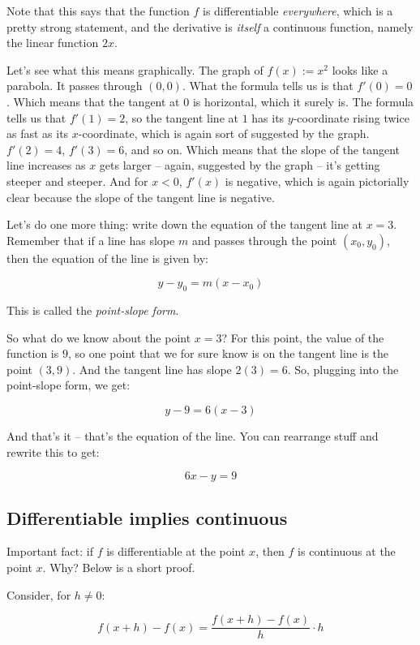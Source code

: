 \documentclass[10pt]{amsart}
\begin{document}
Note that this says that the function $f$ is differentiable {\em
everywhere}, which is a pretty strong statement, and the derivative
is {\em itself} a continuous function, namely the linear function $2x$.

Let's see what this means graphically. The graph of $f(x) := x^2$
looks like a parabola. It passes through $(0,0)$. What the formula
tells us is that $f'(0) = 0$. Which means that the tangent at $0$ is
horizontal, which it surely is. The formula tells us that $f'(1) = 2$,
so the tangent line at $1$ has its $y$-coordinate rising twice as fast
as its $x$-coordinate, which is again sort of suggested by the
graph. $f'(2) = 4$, $f'(3) = 6$, and so on. Which means that the slope
of the tangent line increases as $x$ gets larger -- again, suggested
by the graph -- it's getting steeper and steeper. And for $x < 0$,
$f'(x)$ is negative, which is again pictorially clear because the
slope of the tangent line is negative.

Let's do one more thing: write down the equation of the tangent line
at $x = 3$. Remember that if a line has slope $m$ and passes through
the point $(x_0,y_0)$, then the equation of the line is given by:

$$y - y_0 = m(x - x_0)$$

This is called the {\em point-slope form}.

So what do we know about the point $x = 3$? For this point, the value
of the function is $9$, so one point that we for sure know is on the
tangent line is the point $(3,9)$. And the tangent line has slope
$2(3) = 6$. So, plugging into the point-slope form, we get:

$$y - 9 = 6(x - 3)$$

And that's it -- that's the equation of the line. You can rearrange
stuff and rewrite this to get:

$$6x - y = 9$$

\subsection{Differentiable implies continuous}

Important fact: if $f$ is differentiable at the point $x$, then $f$ is
continuous at the point $x$. Why? Below is a short proof.

Consider, for $h \ne 0$:

\begin{equation*}
  f(x + h) - f(x) = \frac{f(x + h) - f(x)}{h} \cdot h
\end{equation*}
\end{document}
